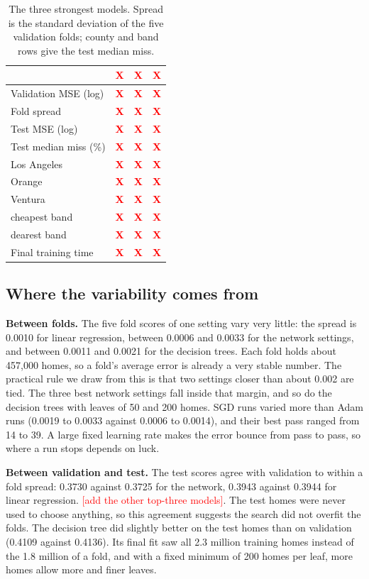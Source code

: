 \documentclass[sigconf,nonacm,10pt]{acmart}
\newcommand{\X}{\textcolor{red}{\textbf{X}}}
\newcommand{\pending}[1]{\textcolor{red}{[#1]}}
\begin{document}
\begin{table}[t]
\caption{The three strongest models. Spread is the standard deviation of the five validation folds; county and band rows give the test median miss.}
\label{tab:top}
\small
\setlength{\tabcolsep}{4pt}
\begin{tabular}{@{}lrrr@{}}
\toprule
 & \X & \X & \X \\
\midrule
Validation MSE (log) & \X & \X & \X \\
Fold spread & \X & \X & \X \\
Test MSE (log) & \X & \X & \X \\
Test median miss (\%) & \X & \X & \X \\
\quad Los Angeles & \X & \X & \X \\
\quad Orange & \X & \X & \X \\
\quad Ventura & \X & \X & \X \\
\quad cheapest band & \X & \X & \X \\
\quad dearest band & \X & \X & \X \\
Final training time & \X & \X & \X \\
\bottomrule
\end{tabular}
\end{table}

\subsection{Where the variability comes from}
\textbf{Between folds.} The five fold scores of one setting vary very little: the spread is 0.0010 for linear regression, between 0.0006 and 0.0033 for the network settings, and between 0.0011 and 0.0021 for the decision trees. Each fold holds about 457,000 homes, so a fold's average error is already a very stable number. The practical rule we draw from this is that two settings closer than about 0.002 are tied. The three best network settings fall inside that margin, and so do the decision trees with leaves of 50 and 200 homes. SGD runs varied more than Adam runs (0.0019 to 0.0033 against 0.0006 to 0.0014), and their best pass ranged from 14 to 39. A large fixed learning rate makes the error bounce from pass to pass, so where a run stops depends on luck.

\textbf{Between validation and test.} The test scores agree with validation to within a fold spread: 0.3730 against 0.3725 for the network, 0.3943 against 0.3944 for linear regression. \pending{add the other top-three models}. The test homes were never used to choose anything, so this agreement suggests the search did not overfit the folds. The decision tree did slightly better on the test homes than on validation (0.4109 against 0.4136). Its final fit saw all 2.3 million training homes instead of the 1.8 million of a fold, and with a fixed minimum of 200 homes per leaf, more homes allow more and finer leaves.
\end{document}
